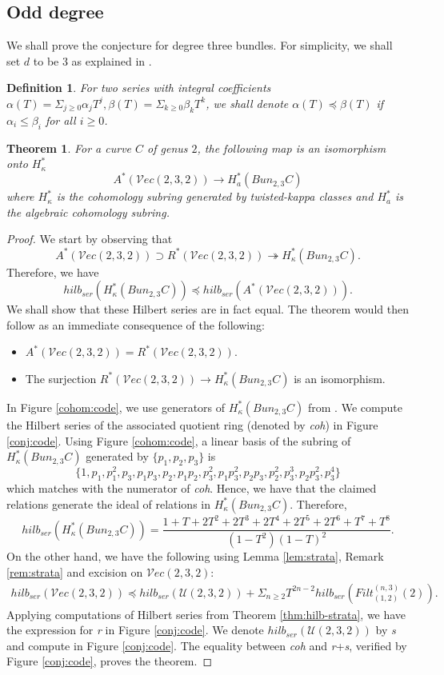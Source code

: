 \documentclass[11pt]{amsart}
\newtheorem{theorem}{Theorem}
\newtheorem{definition}{Definition}[section]
\numberwithin{theorem}{section}
\numberwithin{lemma}{section}
\theoremstyle{definition}
\newcommand{\ri}{\rightarrow}
\newcommand{\U}{\mathscr{U}}
\newcommand{\ve}{\mathcal{V}ec}
\newcommand{\ka}{\kappa}
\newcommand{\ext}{Filt}
\begin{document}
\subsection{Odd degree}
We shall prove the conjecture for degree three bundles. For simplicity, we shall set $d$ to be $3$ as explained in \cite[\S 4]{shubham-r2}.
\begin{definition}
For two series with integral coefficients $\alpha(T) = \Sigma_{j\geq 0}\alpha_jT^j,\beta(T) = \Sigma_{k\geq 0}\beta_kT^k$, we shall denote $\alpha(T)\preceq\beta(T)$ if $\alpha_i\leq \beta_i$ for all $i\geq 0$.
\end{definition}
\begin{theorem}\label{thm:main}
		For a curve $C$ of genus $2$, the following map is an isomorphism onto $H^*_{\ka}$ 
	$$A^*(\ve({2,3,2}))\ri H_{a}^*(Bun_{2,3}C)$$
	where $H^*_{\ka}$ is the cohomology subring generated by twisted-kappa classes and $H^*_a$ is the algebraic cohomology subring. 
\end{theorem}
\begin{proof}
	We start by observing that 
$$A^*(\ve(2,3,2))\supset R^*(\ve(2,3,2))\twoheadrightarrow H^*_\ka(Bun_{2,3}C).$$
Therefore, we have $$hilb_{ser} (H^*_\ka(Bun_{2,3}C))\preceq hilb_{ser}(A^*(\ve(2,3,2))).$$
We shall show that these Hilbert series are in fact equal. The theorem would then follow as an immediate consequence of the following:
\begin{itemize}
	\item $A^*(\ve(2,3,2)) = R^*(\ve(2,3,2))$.
	\item The surjection $R^*(\ve(2,3,2))\ri H^*_\ka(Bun_{2,3}C)$ is an isomorphism.
\end{itemize}
In Figure \ref{cohom:code}, we use generators of $H^*_\ka(Bun_{2,3}C)$ from \cite[Theorem 4.7]{heinloth}. We compute the Hilbert series of the associated quotient ring (denoted by \textit{coh}) in Figure \ref{conj:code}. Using Figure \ref{cohom:code}, a linear basis of the subring of $H^*_\ka(Bun_{2,3}C)$ generated by $\{p_1,p_2,p_3\}$ is 
$$\{1,p_1,p_1^2, p_3, p_1p_3 ,p_2 ,p_1p_2 ,p_3^2 ,p_1p_3^2, p_2p_3,p_2^2, p_3^3,p_2p_3^2,p_3^4 \}$$ 
which matches with the numerator of \textit{coh}. Hence, we have that the claimed relations generate the ideal of relations in $H^*_\ka(Bun_{2,3}C)$. Therefore,
$$hilb_{ser}(H^*_\ka(Bun_{2,3}C)) = \dfrac{1+T+2T^2+2T^3+2T^4+2T^5+2T^6+T^7+T^8}{(1-T^2)(1-T)^2}.$$
On the other hand, we have the following using Lemma \ref{lem:strata}, Remark \ref{rem:strata} and excision on $\ve(2,3,2)$:
\begin{gather*}hilb_{ser}(\ve(2,3,2)) \preceq hilb_{ser}(\U(2,3,2))+\Sigma_{n\geq 2}T^{2n-2}hilb_{ser}(\ext_{(1,2)}^{(n,3)}(2)).\end{gather*}
Applying computations of Hilbert series from Theorem \ref{thm:hilb-strata}, we have the expression for \textit{r} in Figure \ref{conj:code}.
We denote $hilb_{ser}(\U(2,3,2))$ by \textit{s} and compute in Figure \ref{conj:code}. The equality between \textit{coh} and \textit{r}+\textit{s}, verified by Figure \ref{conj:code}, proves the theorem.
\end{proof}
\end{document}
